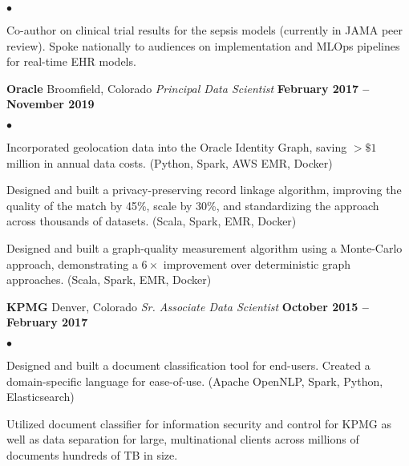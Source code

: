 \documentclass[margin,line, 11pt]{res}
\newenvironment{list2}{
  \begin{list}{$\bullet$}{%
      \setlength{\itemsep}{0in}
      \setlength{\parsep}{0in} \setlength{\parskip}{0in}
      \setlength{\topsep}{0in} \setlength{\partopsep}{0in}
      \setlength{\leftmargin}{0.2in}}}{\end{list}}
\begin{document}
\begin{resume}
\begin{list2}
      \item Co-author on clinical trial results for the sepsis models (currently in JAMA peer review). Spoke nationally to audiences on implementation and MLOps pipelines for real-time EHR models.
    \end{list2}
\vspace*{-3mm}

\textbf{Oracle} \hfill Broomfield, Colorado\newline
\textit{Principal Data Scientist} \hfill \textbf{February 2017 -- November 2019}\newline
    \begin{list2}
    	\vspace*{-5mm}
      \item Incorporated geolocation data into the Oracle Identity Graph, saving $>\$1$ million in annual data costs. (Python, Spark, AWS EMR, Docker)
    	\item Designed and built a privacy-preserving record linkage algorithm, improving the quality of the match by 45\%, scale by 30\%, and standardizing the approach across thousands of datasets. (Scala, Spark, EMR, Docker)
    	\item Designed and built a graph-quality measurement algorithm using a Monte-Carlo approach, demonstrating a $6\times$ improvement over deterministic graph approaches. (Scala, Spark, EMR, Docker)
    \end{list2}
\vspace*{-3mm}

\textbf{KPMG} \hfill Denver, Colorado\newline
\textit{Sr. Associate Data Scientist} \hfill \textbf{October 2015 -- February 2017}\newline
    \begin{list2}
    	\vspace*{-5mm}
      \item Designed and built a document classification tool for end-users. Created a domain-specific language for ease-of-use. (Apache OpenNLP, Spark, Python, Elasticsearch)
      \item Utilized document classifier for information security and control for KPMG as well as data separation for large, multinational clients across millions of documents hundreds of TB in size.
    \end{list2}


\end{resume}
\end{document}
